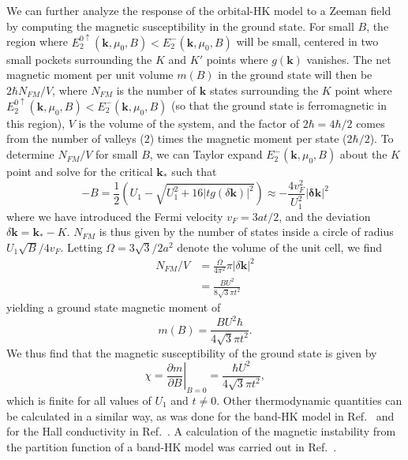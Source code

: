 \documentclass[prb,aps,amssymb,twocolumn,notitlepage]{revtex4-2}
\begin{document}
We can further analyze the response of the orbital-HK model to a Zeeman field by computing the magnetic susceptibility in the ground state.  
For small $B$, the region where $E^{0\uparrow}_{2}(\mathbf{k},\mu_0,B) < E^-_{2}(\mathbf{k},\mu_0,B)$ will be small, centered in two small pockets surrounding the $K$ and $K'$ points where $g(\mathbf{k})$ vanishes. 
The net magnetic moment per unit volume $m(B)$ in the ground state will then be $2\hbar N_{FM}/V$, where $N_{FM}$ is the number of $\mathbf{k}$ states surrounding the $K$ point where $E^{0\uparrow}_{2}(\mathbf{k},\mu_0,B) < E^-_{2}(\mathbf{k},\mu_0,B)$ (so that the ground state is ferromagnetic in this region), $V$ is the volume of the system, and the factor of $2\hbar=4\hbar/2$ comes from the number of valleys ($2$) times the magnetic moment per state ($2\hbar/2$). 
To determine $N_{FM}/V$ for small $B$, we can Taylor expand $E^-_{2}(\mathbf{k},\mu_0,B)$ about the $K$ point and solve for the critical $\mathbf{k_*}$ such that 
\begin{equation}
-B = \frac{1}{2}\left(U_{1}-\sqrt{U^2_{1}+16|tg(\delta\mathbf{k})|^2}\right) \approx -\frac{4v_F^2}{U_1^2}|\mathbf{\delta k}|^2
\end{equation}
where we have introduced the Fermi velocity $v_F = 3at/2$, and the deviation $\delta\mathbf{k} = \mathbf{k_*}-K$. $N_{FM}$ is thus given by the number of states inside a circle of radius $U_1\sqrt{B}/4v_F$. 
Letting $\Omega=3\sqrt{3}/2 a^2$ denote the volume of the unit cell, we find
\begin{align}
N_{FM}/V &= \frac{\Omega}{4\pi^2}\pi |\delta\mathbf{k}|^2 \\
&= \frac{BU^2}{8\sqrt{3}\pi t^2}
\end{align}
yielding a ground state magnetic moment of
\begin{equation}
m(B) = \frac{BU^2\hbar}{4\sqrt{3}\pi t^2}.
\end{equation}
We thus find that the magnetic susceptibility of the ground state is given by
\begin{equation}
\chi = \left.\frac{\partial m}{\partial B}\right|_{B=0} = \frac{\hbar U^2}{4\sqrt{3}\pi t^2},
\end{equation}
which is finite for all values of $U_1$ and $t\neq 0$. 
Other thermodynamic quantities can be calculated in a similar way, as was done for the band-HK model in Ref.~\cite{zhao2021determination} and for the Hall conductivity in Ref.~\cite{zhao2023failure}. A calculation of the magnetic instability from the partition function of a band-HK model was carried out in Ref.~\cite{zhao2023updated}.
\end{document}
